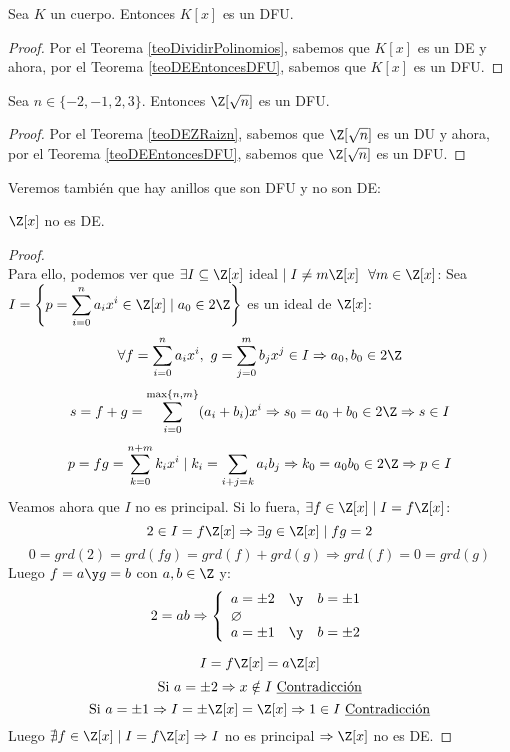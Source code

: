\begin{coro}
    Sea $K$ un cuerpo. Entonces $K[x]$ es un DFU.
\begin{proof}
    Por el Teorema \ref{teoDividirPolinomios}, sabemos que $K[x]$ es un DE y ahora, por el Teorema \ref{teoDEEntoncesDFU}, sabemos
    que $K[x]$ es un DFU.
\end{proof}
\end{coro}

\begin{coro}
    Sea $n \in \{-2, -1, 2, 3\}$. Entonces $\Z[\sqrt{n}]$ es un DFU.
\begin{proof}
    Por el Teorema \ref{teoDEZRaizn}, sabemos que $\Z[\sqrt{n}]$ es un DU y ahora, por el Teorema \ref{teoDEEntoncesDFU}, sabemos
    que $\Z[\sqrt{n}]$ es un DFU.
\end{proof}
\end{coro}

Veremos también que hay anillos que son DFU y no son DE:
\begin{prop}
    $\Z[x]$ no es DE.
\begin{proof}
    \ \\
    Para ello, podemos ver que $\exists I \subseteq \Z[x]$ ideal $\mid I\neq m\Z[x]~~\forall m \in \Z[x]$:\newline
    Sea $\displaystyle I = \left\{p = \sum_{i=0}^n a_i x^i \in \Z[x] \mid a_0 \in 2\Z \right\}$ es un ideal de $\Z[x]$:
    $$\forall f = \sum_{i=0}^n a_i x^i, ~g=\sum_{j=0}^m b_j x^j \in I \Rightarrow a_0, b_0 \in 2\Z$$
    $$s=f+g = \sum_{i=0}^{\max\{n,m\}}(a_i+b_i) x^i \Rightarrow s_0 = a_0+b_0 \in 2\Z \Rightarrow s \in I$$
    $$p = fg = \sum_{k=0}^{n+m} k_i x^i \mid k_i = \sum_{i+j=k} a_i b_j \Rightarrow k_0 = a_0b_0 \in 2\Z \Rightarrow p \in I$$
    Veamos ahora que $I$ no es principal. Si lo fuera, $\exists f \in \Z[x] \mid I = f\Z[x]$:
    $$2 \in I=f\Z[x] \Rightarrow \exists g \in \Z[x] \mid fg = 2$$
    $$0 = grd(2) = grd(fg) = grd(f) + grd(g) \Rightarrow grd(f) = 0 = grd(g)$$
    Luego $f = a \y g=b$ con $a,b \in \Z$ y:
    $$2=ab \Rightarrow \left\{\begin{array}{lll}
            a = \pm 2 & \y & b = \pm 1 \\
            \o        &    &           \\
            a = \pm 1 & \y & b = \pm 2
        \end{array} \right.$$

    $$I = f\Z[x] = a\Z[x]$$
    $$\mbox{Si } a=\pm 2 \Rightarrow x \notin I \mbox{ \underline{Contradicción}}$$
    $$\mbox{Si } a=\pm 1 \Rightarrow I=\pm\Z[x] = \Z[x] \Rightarrow 1 \in I \mbox{ \underline{Contradicción}}$$
    Luego $\nexists f \in \Z[x] \mid I=f\Z[x] \Rightarrow I$ no es principal $\Rightarrow \Z[x]$ no es DE.
\end{proof}
\end{prop}

